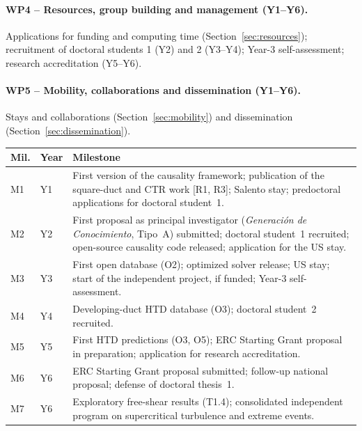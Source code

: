\documentclass[11pt]{article}
\begin{document}
\paragraph{WP4 -- Resources, group building and management (Y1--Y6).} Applications for
funding and computing time (Section~\ref{sec:resources}); recruitment of doctoral students
1 (Y2) and 2 (Y3--Y4); Year-3 self-assessment; research accreditation (Y5--Y6).

\paragraph{WP5 -- Mobility, collaborations and dissemination (Y1--Y6).} Stays and
collaborations (Section~\ref{sec:mobility}) and dissemination
(Section~\ref{sec:dissemination}).

\begin{center}\small
\begin{tabularx}{\textwidth}{@{}p{0.8cm}p{1.35cm}X@{}}
\toprule
\textbf{Mil.} & \textbf{Year} & \textbf{Milestone} \\
\midrule
M1 & Y1 & First version of the causality framework; publication of the square-duct and CTR work [R1, R3]; Salento stay; predoctoral applications for doctoral student~1. \\
M2 & Y2 & First proposal as principal investigator (\emph{Generaci\'on de Conocimiento}, Tipo~A) submitted; doctoral student~1 recruited; open-source causality code released; application for the US stay. \\
M3 & Y3 & First open database (O2); optimized solver release; US stay; start of the independent project, if funded; Year-3 self-assessment. \\
M4 & Y4 & Developing-duct HTD database (O3); doctoral student~2 recruited. \\
M5 & Y5 & First HTD predictions (O3, O5); ERC Starting Grant proposal in preparation; application for research accreditation. \\
M6 & Y6 & ERC Starting Grant proposal submitted; follow-up national proposal; defense of doctoral thesis~1. \\
M7 & Y6 & Exploratory free-shear results (T1.4); consolidated independent program on supercritical turbulence and extreme events. \\
\bottomrule
\end{tabularx}
\end{center}
\end{document}
